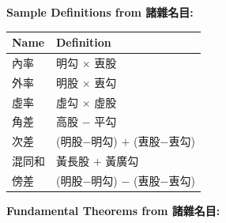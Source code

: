 \documentclass[11pt,a4paper]{article}
\begin{document}
\vspace{0.3cm}

\textbf{Sample Definitions from 諸雜名目:}

\begin{center}
\begin{tabular}{ll}
\toprule
\textbf{Name} & \textbf{Definition} \\
\midrule
內率 & 明勾 $\times$ 叀股 \\
外率 & 明股 $\times$ 叀勾 \\
虛率 & 虛勾 $\times$ 虛股 \\
角差 & 高股 $-$ 平勾 \\
次差 & (明股$-$明勾) $+$ (叀股$-$叀勾) \\
混同和 & 黃長股 $+$ 黃廣勾 \\
傍差 & (明股$-$明勾) $-$ (叀股$-$叀勾) \\
\bottomrule
\end{tabular}
\end{center}

\vspace{0.3cm}

\textbf{Fundamental Theorems from 諸雜名目:}
\end{document}
